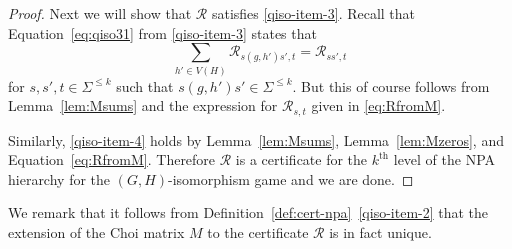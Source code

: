 \documentclass[a4paper,onecolumn,11pt,accepted=2026-01-06]{quantumarticle}
\theoremstyle{plain}
\theoremstyle{remark}
\theoremstyle{definition}
\DeclareMathOperator{\rel}{rel}
\begin{document}
\begin{proof}
Next we will show that $\mathcal{R}$ satisfies \ref{qiso-item-3}. Recall that Equation~\eqref{eq:qiso31} from \ref{qiso-item-3} states that
\[\sum_{h' \in V(H)} \mathcal{R}_{s(g,h')s',t} = \mathcal{R}_{ss',t}\]
for $s,s',t \in \Sigma^{\le k}$ such that $s(g,h')s' \in \Sigma^{\le k}$. But this of course follows from Lemma~\ref{lem:Msums} and the expression for $\mathcal{R}_{s,t}$ given in \eqref{eq:RfromM}. %

Similarly, \ref{qiso-item-4} holds by Lemma~\ref{lem:Msums}, Lemma~\ref{lem:Mzeros}, and Equation~\eqref{eq:RfromM}. Therefore $\mathcal{R}$ is a certificate for the $k^\text{th}$ level of the NPA hierarchy for the $(G,H)$-isomorphism game and we are done.
\end{proof}

We remark that it follows from Definition~\ref{def:cert-npa}~\ref{qiso-item-2} that the extension of the Choi matrix $M$ to the certificate $\mathcal{R}$ is in fact unique.
\end{document}
